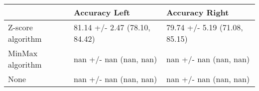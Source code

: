 \begin{tabular}{lll}
\toprule
{} &                  Accuracy Left &                 Accuracy Right \\
\midrule
Z-score algorithm &  81.14 +/- 2.47 (78.10, 84.42) &  79.74 +/- 5.19 (71.08, 85.15) \\
MinMax algorithm  &         nan +/- nan (nan, nan) &         nan +/- nan (nan, nan) \\
None              &         nan +/- nan (nan, nan) &         nan +/- nan (nan, nan) \\
\bottomrule
\end{tabular}

